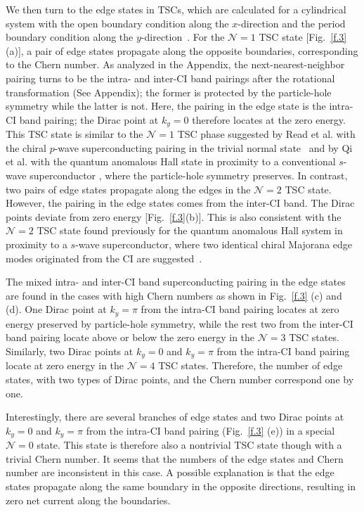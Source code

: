 \documentclass[12pt]{iopart}
\begin{document}
We then turn to the edge states in TSCs, which are calculated for a cylindrical system with the open boundary condition along the $x$-direction and the period boundary condition along the $y$-direction~\cite{Potter-PRL2010}. For the $\mathcal{N}=1$ TSC state [Fig.~\ref{f.3}(a)], a pair of edge states propagate along the opposite boundaries, corresponding to the Chern number. As analyzed in the Appendix, the next-nearest-neighbor pairing turns to be the intra- and inter-CI band pairings after the rotational transformation (See Appendix); the former is protected by the particle-hole symmetry while the latter is not. Here, the pairing in the edge state is the intra-CI band pairing; the Dirac point at $k_{y}=0$ therefore locates at the zero energy. This TSC state is similar to the $\mathcal{N}=1$ TSC phase suggested by Read et al. with the chiral $p$-wave superconducting pairing in the trivial normal state~\cite{Read-PRB2000} and by Qi et al. with the quantum anomalous Hall state in proximity to a conventional $s$-wave superconductor \cite{Qi-PRB2010}, where the particle-hole symmetry preserves. In contrast, two pairs of edge states propagate along the edges in the $\mathcal{N}=2$ TSC state. However, the pairing in the edge states comes from the inter-CI band. The Dirac points deviate from zero energy [Fig.~\ref{f.3}(b)]. This is also consistent with the $\mathcal{N}=2$ TSC state found previously for the quantum anomalous Hall system in proximity to a $s$-wave superconductor, where two identical chiral Majorana edge modes originated from the CI are suggested~\cite{Qi-PRB2010}.

The mixed intra- and inter-CI band superconducting pairing in the edge states are found in the cases with high Chern numbers as shown in Fig.~\ref{f.3} (c) and (d). One Dirac point at $k_{y}=\pi$ from the intra-CI band pairing locates at zero energy preserved by particle-hole symmetry, while the rest two from the inter-CI band pairing locate above or below the zero energy in the $\mathcal{N}=3$ TSC states. Similarly, two Dirac points at $k_{y}=0$ and $k_{y}=\pi$ from the intra-CI band pairing locate at zero energy in the $\mathcal{N}=4$ TSC states. Therefore, the number of edge states, with two types of Dirac points, and the Chern number correspond one by one.

Interestingly, there are several branches of edge states and two Dirac points at $k_{y}=0$ and $k_{y}=\pi$ from the intra-CI band pairing (Fig.~\ref{f.3} (e)) in a special $\mathcal{N}=0$ state. This state is therefore also a nontrivial TSC state though with a trivial Chern number. It seems that the numbers of the edge states and Chern number are inconsistent in this case. A possible explanation is that the edge states propagate along the same boundary in the opposite directions, resulting in zero net current along the boundaries.
\end{document}
